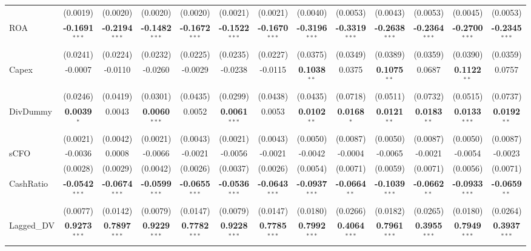 \begin{landscape}
\begin{table}[H]
\begin{tabular}{lcccccccccccc}
 & (0.0019) & (0.0020) & (0.0020) & (0.0020) & (0.0021) & (0.0021) & (0.0040) & (0.0053) & (0.0043) & (0.0053) & (0.0045) & (0.0053) \\
ROA & \textbf{-0.1691}$^{***}$ & \textbf{-0.2194}$^{***}$ & \textbf{-0.1482}$^{***}$ & \textbf{-0.1672}$^{***}$ & \textbf{-0.1522}$^{***}$ & \textbf{-0.1670}$^{***}$ & \textbf{-0.3196}$^{***}$ & \textbf{-0.3319}$^{***}$ & \textbf{-0.2638}$^{***}$ & \textbf{-0.2364}$^{***}$ & \textbf{-0.2700}$^{***}$ & \textbf{-0.2345}$^{***}$ \\
 & (0.0241) & (0.0224) & (0.0232) & (0.0225) & (0.0235) & (0.0227) & (0.0375) & (0.0349) & (0.0389) & (0.0359) & (0.0390) & (0.0359) \\
Capex & -0.0007 & -0.0110 & -0.0260 & -0.0029 & -0.0238 & -0.0115 & \textbf{0.1038}$^{**}$ & 0.0375 & \textbf{0.1075}$^{**}$ & 0.0687 & \textbf{0.1122}$^{**}$ & 0.0757 \\
 & (0.0246) & (0.0419) & (0.0301) & (0.0435) & (0.0299) & (0.0438) & (0.0435) & (0.0718) & (0.0511) & (0.0732) & (0.0515) & (0.0737) \\
DivDummy & \textbf{0.0039}$^{*}$ & 0.0043 & \textbf{0.0060}$^{***}$ & 0.0052 & \textbf{0.0061}$^{***}$ & 0.0053 & \textbf{0.0102}$^{**}$ & \textbf{0.0168}$^{*}$ & \textbf{0.0121}$^{**}$ & \textbf{0.0183}$^{**}$ & \textbf{0.0133}$^{***}$ & \textbf{0.0192}$^{**}$ \\
 & (0.0021) & (0.0042) & (0.0021) & (0.0043) & (0.0021) & (0.0043) & (0.0050) & (0.0087) & (0.0050) & (0.0087) & (0.0050) & (0.0087) \\
sCFO & -0.0036 & 0.0008 & -0.0066 & -0.0021 & -0.0056 & -0.0021 & -0.0042 & -0.0004 & -0.0065 & -0.0021 & -0.0054 & -0.0023 \\
 & (0.0028) & (0.0029) & (0.0042) & (0.0026) & (0.0037) & (0.0026) & (0.0054) & (0.0071) & (0.0059) & (0.0071) & (0.0056) & (0.0071) \\
CashRatio & \textbf{-0.0542}$^{***}$ & \textbf{-0.0674}$^{***}$ & \textbf{-0.0599}$^{***}$ & \textbf{-0.0655}$^{***}$ & \textbf{-0.0536}$^{***}$ & \textbf{-0.0643}$^{***}$ & \textbf{-0.0937}$^{***}$ & \textbf{-0.0664}$^{**}$ & \textbf{-0.1039}$^{***}$ & \textbf{-0.0662}$^{**}$ & \textbf{-0.0933}$^{***}$ & \textbf{-0.0659}$^{**}$ \\
 & (0.0077) & (0.0142) & (0.0079) & (0.0147) & (0.0079) & (0.0147) & (0.0180) & (0.0266) & (0.0182) & (0.0265) & (0.0180) & (0.0264) \\
Lagged\_DV & \textbf{0.9273}$^{***}$ & \textbf{0.7897}$^{***}$ & \textbf{0.9229}$^{***}$ & \textbf{0.7782}$^{***}$ & \textbf{0.9228}$^{***}$ & \textbf{0.7785}$^{***}$ & \textbf{0.7992}$^{***}$ & \textbf{0.4064}$^{***}$ & \textbf{0.7961}$^{***}$ & \textbf{0.3955}$^{***}$ & \textbf{0.7949}$^{***}$ & \textbf{0.3937}$^{***}$ \\

\end{tabular}
\end{table}
\end{landscape}
